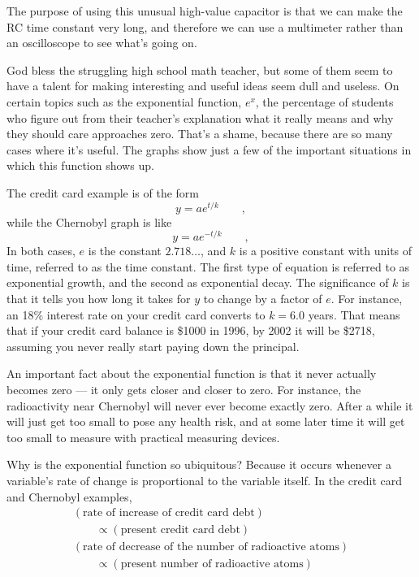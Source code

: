 The purpose of using this unusual high-value capacitor is that we can make the RC time constant
very long, and therefore we can use a multimeter rather than an oscilloscope to see what's going
on.

\introduction

God bless the struggling high school math teacher, but some
of them seem to have a talent for making interesting and
useful ideas seem dull and useless. On certain topics such
as the exponential function, $e^x$, the percentage of students
who figure out from their teacher's explanation what it
really means and why they should care approaches zero.
That's a shame, because there are so many cases where it's
useful. The graphs show just a few of the important
situations in which this function shows up.


The credit card example is of the form
\begin{equation*}
    y=ae^{t/k}   \qquad   ,
\end{equation*}
while the Chernobyl graph is like
\begin{equation*}
    y=ae^{-t/k}    \qquad   ,
\end{equation*}
In both cases, $e$ is the constant $2.718\ldots$, and $k$ is a
positive constant with units of time, referred to as the
time constant. The first type of equation is referred to as
exponential growth, and the second as exponential decay. The
significance of $k$ is that it tells you how long it takes
for $y$ to change by a factor of $e$. For instance, an 18\%
interest rate on your credit card converts to $k=6.0$ years.
That means that if your credit card balance is \$1000 in
1996, by 2002 it will be \$2718, assuming you never really
start paying down the principal.

An important fact about the exponential function is that it
never actually becomes zero --- it only gets closer and
closer to zero. For instance, the radioactivity near
Chernobyl will never ever become exactly zero. After a while
it will just get too small to pose any health risk, and at
some later time it will get too small to measure with
practical measuring devices.

Why is the exponential function so ubiquitous? Because it
occurs whenever a variable's rate of change is proportional
to the variable itself. In the credit card and Chernobyl examples,
\begin{gather*}
    (\text{rate of increase of credit card debt}) \\
    \qquad	\propto(\text{present credit card debt})    \\
    (\text{rate of decrease of the number of radioactive atoms}) \\
    \qquad	\propto(\text{present number of radioactive atoms})    
\end{gather*}


